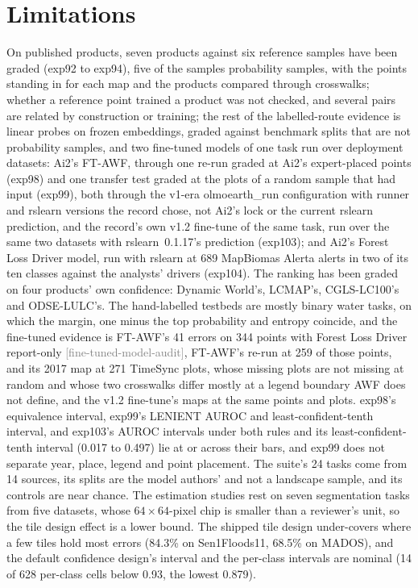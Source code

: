 \documentclass[11pt,a4paper]{article}
\newcommand{\claim}[1]{{\scriptsize\textsf{\textcolor{gray}{[#1]}}}}
\begin{document}
\section{Limitations}
\label{sec:limits}

On published products, seven products against six reference samples have been graded (exp92 to exp94), five of the
samples probability samples, with the points standing in for each map and the products compared through crosswalks;
whether a reference point trained a product was not checked, and several pairs are related by construction or
training; the rest of the
labelled-route evidence is linear probes on frozen embeddings, graded against benchmark splits that are not probability
samples, and two fine-tuned models of one task run over deployment datasets: Ai2's FT-AWF, through one re-run graded at
Ai2's expert-placed points (exp98) and one transfer test graded at the plots of a random sample that had input
(exp99), both through the v1-era olmoearth\_run configuration with runner and rslearn versions the record chose, not
Ai2's lock or the current rslearn prediction, and the record's own v1.2 fine-tune of the same task, run over the same
two datasets with rslearn~0.1.17's prediction (exp103); and Ai2's Forest Loss Driver model, run with rslearn at 689
MapBiomas Alerta alerts in two of its ten classes against the analysts' drivers (exp104). The ranking has been graded on four products' own confidence: Dynamic World's, LCMAP's, CGLS-LC100's and
ODSE-LULC's. The hand-labelled testbeds are mostly binary water
tasks, on which the margin, one minus the top probability and entropy coincide, and the fine-tuned evidence is FT-AWF's
41 errors on 344 points with Forest Loss Driver report-only \claim{fine-tuned-model-audit}, FT-AWF's re-run at 259 of
those points, and its 2017 map at 271 TimeSync plots, whose missing plots are not missing at random and whose two
crosswalks differ mostly at a legend boundary AWF does not define, and the v1.2 fine-tune's maps at the same points and
plots. exp98's equivalence interval, exp99's LENIENT AUROC and least-confident-tenth interval, and exp103's AUROC
intervals under both rules and its least-confident-tenth interval (0.017 to 0.497) lie at or across their bars, and
exp99 does not separate year, place, legend and point placement. The suite's 24 tasks come
from 14 sources, its splits are the model authors' and not a landscape sample, and its controls are near chance. The
estimation studies rest on seven segmentation tasks from five datasets, whose $64\times64$-pixel chip is smaller than a
reviewer's unit, so the tile design effect is a lower bound. The shipped tile design under-covers where a few tiles hold
most errors (84.3\% on Sen1Floods11, 68.5\% on MADOS), and the default confidence design's interval and the per-class
intervals are nominal (14 of 628 per-class cells below 0.93, the lowest 0.879).
\end{document}
